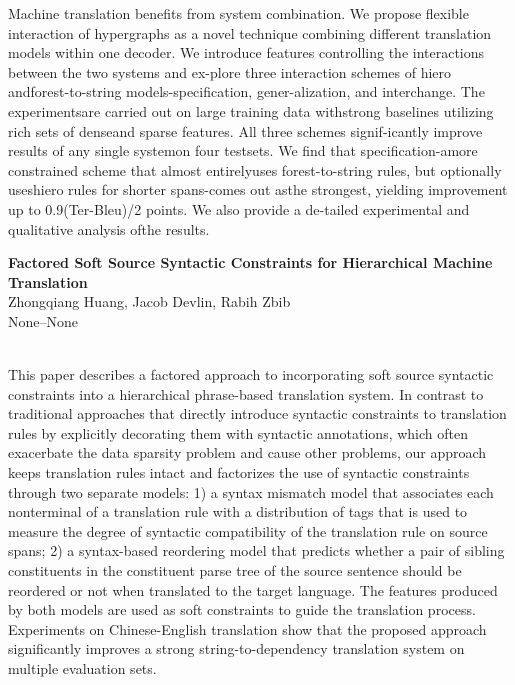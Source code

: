 \documentclass[twoside,makeidx]{book}
\renewcommand{\normalsize}{\fontsize{8}{9}\selectfont}
\renewcommand{\small}{\fontsize{7}{8}\selectfont}
\begin{document}
\nopagebreak%
\noindent%
{\small Machine translation benefits from system combination. We propose flexible interaction of hypergraphs as a novel technique combining different translation models within one decoder. We introduce features controlling the interactions between the two systems and ex-plore three interaction schemes of hiero andforest-to-string models-specification, gener-alization, and interchange. The experimentsare carried out on large training data withstrong baselines utilizing rich sets of denseand sparse features. All three schemes signif-icantly improve results of any single systemon four testsets. We find that specification-amore constrained scheme that almost entirelyuses forest-to-string rules, but optionally useshiero rules for shorter spans-comes out asthe strongest, yielding improvement up to 0.9(Ter-Bleu)/2 points. We also provide a de-tailed experimental and qualitative analysis ofthe results.}
\par\vspace{2em}\noindent%
\begin{minipage}{\linewidth}%
\begin{center}
\textbf{\normalsize Factored Soft Source Syntactic Constraints for Hierarchical Machine Translation}\\
\normalsize  Zhongqiang Huang,  Jacob Devlin,  Rabih Zbib\\
{\small None--None}\\
\end{center}
\end{minipage}\\[0.5em]
\nopagebreak%
\noindent%
{\small This paper describes a factored approach to incorporating soft source syntactic constraints into a hierarchical phrase-based translation system. In contrast to traditional approaches that directly introduce syntactic constraints to translation rules by explicitly decorating them with syntactic annotations, which often exacerbate the data sparsity problem and cause other problems, our approach keeps translation rules intact and factorizes the use of syntactic constraints through two separate models: 1) a syntax mismatch model that associates each nonterminal of a translation rule with a distribution of tags that is used to measure the degree of syntactic compatibility of the translation rule on source spans;  2) a syntax-based reordering model that predicts whether a pair of sibling constituents in the constituent parse tree of the source sentence should be reordered or not when translated to the target language. The features produced by both models are used as soft constraints to guide the translation process. Experiments on Chinese-English translation show that the proposed approach significantly improves a strong string-to-dependency translation system on multiple evaluation sets.}
\end{document}
